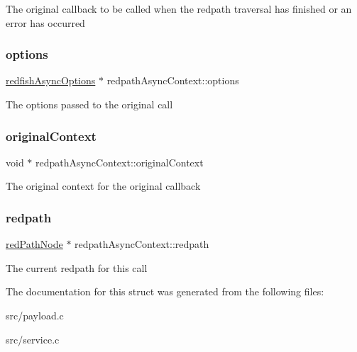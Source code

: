 The original callback to be called when the redpath traversal has finished or an error has occurred \mbox{\label{structredpathAsyncContext_aa9cad0a8f6b371db4ec82c4c3d104edb}} 
\subsubsection{\texorpdfstring{options}{options}}
{\footnotesize\ttfamily \hyperlink{structredfishAsyncOptions}{redfish\+Async\+Options} $\ast$ redpath\+Async\+Context\+::options}

The options passed to the original call \mbox{\label{structredpathAsyncContext_abe2573fe9e61a4dbdba5e9da2df3ccde}} 
\subsubsection{\texorpdfstring{original\+Context}{originalContext}}
{\footnotesize\ttfamily void $\ast$ redpath\+Async\+Context\+::original\+Context}

The original context for the original callback \mbox{\label{structredpathAsyncContext_a6891b0c642edde43577b6f130d097d54}} 
\subsubsection{\texorpdfstring{redpath}{redpath}}
{\footnotesize\ttfamily \hyperlink{redpath_8h_a8b4f53a300a73308d7a81abaa2258fc6}{red\+Path\+Node} $\ast$ redpath\+Async\+Context\+::redpath}

The current redpath for this call 

The documentation for this struct was generated from the following files\+:\begin{DoxyCompactItemize}
\item 
src/payload.\+c\item 
src/service.\+c\end{DoxyCompactItemize}
